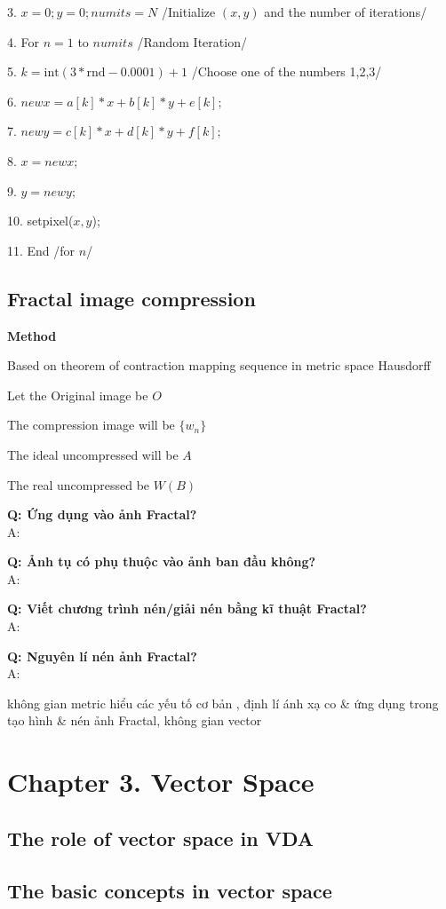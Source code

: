 3. $x=0; y=0; numits=N$ /Initialize $(x,y)$ and the number of iterations/

4. For $n=1$ to $numits$ /Random Iteration/

5. $k=\text{int}(3*\text{rnd}-0.0001)+1$ /Choose one of the numbers 1,2,3/

6. $newx=a[k]*x+b[k]*y+e[k];$

7. $newy=c[k]*x+d[k]*y+f[k];$

8. $x= newx;$

9. $y=newy;$

10. setpixel($x,y$);

11. End /for $n$/


\subsection {Fractal image compression}

\textbf{Method}

Based on theorem of contraction mapping sequence in metric space Hausdorff

Let the Original image be $O$

The compression image will be $\{ w_n \}$

The ideal uncompressed will be $A$

The real uncompressed be $W(B)$

\textbf{Q: Ứng dụng vào ảnh Fractal?}\\
A: 

\textbf{Q: Ảnh tụ có phụ thuộc vào ảnh ban đầu không?}\\
A:

\textbf{Q: Viết chương trình nén/giải nén bằng kĩ thuật Fractal?}\\
A: 

\textbf{Q: Nguyên lí nén ảnh Fractal?}\\
A: 


không gian metric hiểu các yếu tố cơ bản
, định lí ánh xạ co \& ứng dụng trong tạo hình \& nén ảnh Fractal, 
không gian vector

\section{Chapter 3. Vector Space}
\subsection{The role of vector space in VDA}
\subsection{The basic concepts in vector space}
